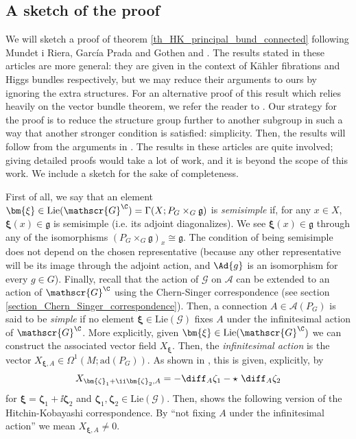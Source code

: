 \subsection{A sketch of the proof} \label{section_sketch_proof}
We will sketch a proof of theorem \ref{th_HK_principal_bund_connected} following Mundet i Riera, García Prada and Gothen \parencite{i1999hitchin} and \parencite{garcia2009hitchin}. The results stated in these articles are more general: they are given in the context of Kähler fibrations and Higgs bundles respectively, but we may reduce their arguments to ours by ignoring the extra structures. For an alternative proof of this result which relies heavily on the vector bundle theorem, we refer the reader to \parencite{anchouche2001einstein}. Our strategy for the proof is to reduce the structure group further to another subgroup in such a way that another stronger condition is satisfied: simplicity. Then, the results will follow from the arguments in \parencite{i1999hitchin}. The results in these articles are quite involved; giving detailed proofs would take a lot of work, and it is beyond the scope of this work. We include a sketch for the sake of completeness.  

First of all, we say that an element \(\bm{\xi} \in \mathrm{Lie}(\mathscr{G}^\C)=\Gamma(X; P_G \times_G \mathfrak{g})\) is \textit{semisimple} if, for any \(x \in X\), \(\bm{\xi}(x)\in \mathfrak{g}\) is semisimple (i.e. its adjoint diagonalizes). We see \(\bm{\xi}(x)\in \mathfrak{g}\) through any of the isomorphisms \((P_G \times_G \mathfrak{g})_x \cong \mathfrak{g}\). The condition of being semisimple does not depend on the chosen representative (because any other representative will be its image through the adjoint action, and \(\Ad{g}\) is an isomorphism for every \(g \in G\)). Finally, recall that the action of \(\mathscr{G}\) on \(\mathscr{A}\) can be extended to an action of \(\mathscr{G}^\C\) using the Chern-Singer correspondence (see section \ref{section_Chern_Singer_correspondence}). Then, a connection \(A \in \mathscr{A}(P_G)\) is said to be \textit{simple} if no element \(\bm{\xi} \in \mathrm{Lie}(\mathscr{G})\) fixes \(A\) under the infinitesimal action of \(\mathscr{G}^\C\). More explicitly, given \(\bm{\xi}\in \mathrm{Lie}(\mathscr{G}^\C)\) we can construct the associated vector field \(X_{\bm{\xi}}\). Then, the \textit{infinitesimal action} is the vector \(X_{\bm{\xi},A}\in \Omega^1(M;\mathrm{ad}(P_G))\). As shown in \parencite[Prop. 2.3]{trautwein2015surveygitpictureyangmills}, this is given, explicitly, by
\[
X_{\bm{\zeta}_1+ \ii \bm{\zeta}_2, A}=-\diff_A \zeta_1 - \star \  \diff_A \zeta_2
\]
for \(\bm{\xi}=\bm{\zeta}_1 + \ii \bm{\zeta}_2\) and \(\bm{\zeta}_1 , \bm{\zeta}_2 \in \mathrm{Lie}(\mathscr{G})\). Then, \parencite{i1999hitchin} shows the following version of the Hitchin-Kobayashi correspondence. By ``not fixing \(A\) under the infinitesimal action'' we mean \(X_{\bm{\xi}, A} \neq 0\).

